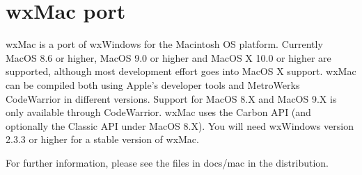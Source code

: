 \section{wxMac port}\label{wxmacport}

wxMac is a port of wxWindows for the Macintosh OS platform.
Currently MacOS 8.6 or higher, MacOS 9.0 or higher and
MacOS X 10.0 or higher are supported, although most development
effort goes into MacOS X support. wxMac can be compiled both
using Apple's developer tools and MetroWerks CodeWarrior in
different versions. Support for MacOS 8.X and MacOS 9.X is
only available through CodeWarrior. wxMac uses the Carbon
API (and optionally the Classic API under MacOS 8.X). You
will need wxWindows version 2.3.3 or higher for a stable
version of wxMac.

For further information, please see the files in docs/mac
in the distribution.

